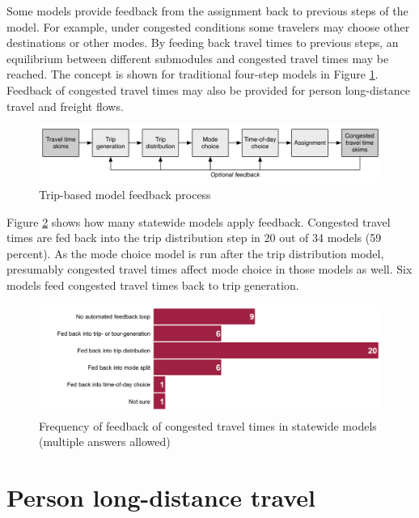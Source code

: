 Some models provide feedback from the assignment back to previous steps of the model. For example, under congested conditions some travelers may choose other destinations or other modes. By feeding back travel times to previous steps, an equilibrium between different submodules and congested travel times may be reached. The concept is shown for traditional four-step models in Figure \ref{fig:trip-based-feedback}. Feedback of congested travel times may also be provided for person long-distance travel and freight flows.

\begin{figure}   %
\centering
\includegraphics[width=6.4in]{graphics/14-feedback-process}
\caption{Trip-based model feedback process}
\label{fig:trip-based-feedback}
\end{figure}

Figure \ref{fig:feedback-frequency} shows how many statewide models apply feedback. Congested travel times are fed back into the trip distribution step in 20 out of 34 models (59 percent). As the mode choice model is run after the trip distribution model, presumably congested travel times affect mode choice in those models as well. Six models feed congested travel times back to trip generation.

\begin{figure}   %
\centering
\includegraphics[width=6.4in]{graphics/15-feedback-frequency}
\caption[Frequency of feedback of congested travel times in statewide models]{Frequency of feedback of congested travel times in statewide models (multiple answers allowed)}
\label{fig:feedback-frequency}
\end{figure}

\section{Person long-distance travel}

